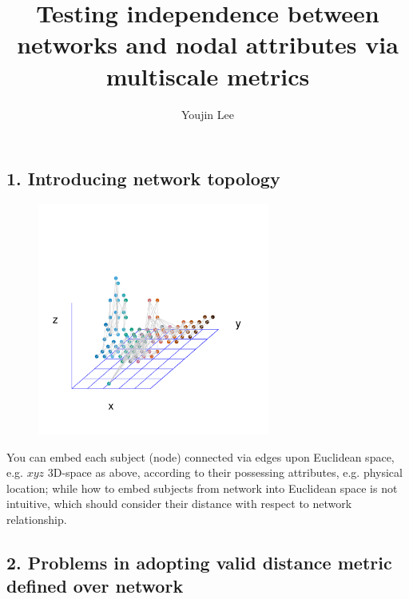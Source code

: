 \documentclass[12pt]{article}
\begin{document}
	
	\title{Testing independence between networks and nodal attributes via multiscale metrics}
	
	\author{Youjin Lee}
	
	\maketitle
		
\subsection*{1. Introducing network topology}

\begin{figure}[H]
	\centering
	\includegraphics[width=3in]{../Figure/intro.pdf}	
	\label{fig:intro}
\end{figure}

You can embed each subject (node) connected via edges upon Euclidean space, e.g. $xyz$ 3D-space as above, according to their possessing attributes, e.g. physical location; while how to embed subjects from network into Euclidean space is not intuitive, which should consider their distance with respect to network relationship.

\subsection*{2. Problems in adopting  valid distance metric defined over network}
\end{document}
